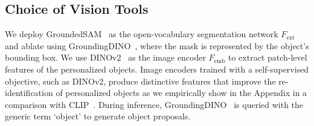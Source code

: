 \subsection{Choice of Vision Tools}
We deploy  GroundedSAM~\cite{ren2024grounded} as the open-vocabulary segmentation network $F_\text{ext}$ and ablate using GroundingDINO~\cite{liu2023grounding}, where the mask is represented by the object’s bounding box. We use DINOv2~\cite{oquab2023dinov2} as the image encoder $F_\text{emb}$ to extract patch-level features of the personalized objects.
Image encoders trained with a self-supervised objective, such as DINOv2, produce distinctive features that improve the re-identification of personalized objects as we empirically show in the Appendix in a comparison  with CLIP~\cite{radford2021clip}.
During inference, GroundingDINO~\cite{liu2023grounding} is queried with the generic term `object' to generate object proposals.


\vspace{-0.2cm}
